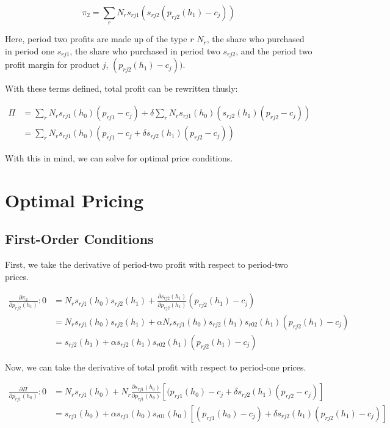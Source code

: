 \documentclass[12pt]{article}
\theoremstyle{definition}
\theoremstyle{remark}
\begin{document}
\begin{equation}
  \pi_2 = \sum_rN_rs_{rj1}(s_{rj2}(p_{rj2}(h_1) - c_j))
\end{equation}

Here, period two profits are made up of the type $r$ $N_r$, the share who
purchased in period one $s_{rj1}$, the share who purchased in period two
$s_{rj2}$, and the period two profit margin for product $j$, $(p_{rj2}(h_1) - c_j))$.

With these terms defined, total profit can be rewritten thusly:

\begin{align}
  \Pi &= \sum_rN_rs_{rj1}(h_0)(p_{rj1} - c_j) + \delta\sum_rN_rs_{rj1}(h_0)(s_{rj2}(h_1)(p_{rj2} - c_j)) \\
  &= \sum_rN_rs_{rj1}(h_0)(p_{rj1} - c_j + \delta s_{rj2}(h_1)(p_{rj2}-c_j))
\end{align}

With this in mind, we can solve for optimal price conditions.


\section{Optimal Pricing}
\label{sec:optimal-pricing}

\subsection{First-Order Conditions}
\label{subsec:foc}

First, we take the derivative of period-two profit with respect to period-two prices.

\begin{align}
  \frac{\partial\pi_2}{\partial p_{rj2}(h_1)}: 0 &= N_rs_{rj1}(h_0)s_{rj2}(h_1) +
  \frac{\partial s_{rj2}(h_1)}{\partial p_{rj2}(h_1)}(p_{rj2}(h_1) - c_j) \\
  &= N_rs_{rj1}(h_0)s_{rj2}(h_1) + \alpha
  N_rs_{rj1}(h_0)s_{rj2}(h_1)s_{r02}(h_1)(p_{rj2}(h_1) - c_j) \\
  &= s_{rj2}(h_1) + \alpha s_{rj2}(h_1)s_{r02}(h_1)(p_{rj2}(h_1) - c_j)
\end{align}

Now, we can take the derivative of total profit with respect to period-one prices.

\begin{align}
  \frac{\partial\Pi}{\partial p_{rj1}(h_0)}: 0 &= N_rs_{rj1}(h_0) +
  N_r\frac{\partial s_{rj1}(h_0)}{\partial p_{rj1}(h_0)}[(p_{rj1}(h_0) - c_j +
  \delta s_{rj2}(h_1)(p_{rj2} - c_j)] \\
  &= s_{rj1}(h_0) + \alpha s_{rj1}(h_0)s_{r01}(h_0)[(p_{rj1}(h_0) - c_j) + \delta
  s_{rj2}(h_1)(p_{rj2}(h_1) - c_j)]
\end{align}
\end{document}
